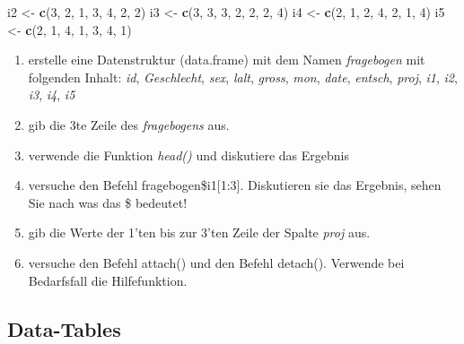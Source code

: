 \documentclass[]{article}
\newenvironment{Shaded}{\begin{snugshade}}{\end{snugshade}}
\newcommand{\KeywordTok}[1]{\textcolor[rgb]{0.13,0.29,0.53}{\textbf{#1}}}
\newcommand{\DecValTok}[1]{\textcolor[rgb]{0.00,0.00,0.81}{#1}}
\newcommand{\StringTok}[1]{\textcolor[rgb]{0.31,0.60,0.02}{#1}}
\newcommand{\NormalTok}[1]{#1}
\providecommand{\tightlist}{%
  \setlength{\itemsep}{0pt}\setlength{\parskip}{0pt}}
\begin{document}
\begin{Shaded}
\begin{Highlighting}[]
\NormalTok{    i2     <-}\StringTok{ }\KeywordTok{c}\NormalTok{(}\DecValTok{3}\NormalTok{, }\DecValTok{2}\NormalTok{, }\DecValTok{1}\NormalTok{, }\DecValTok{3}\NormalTok{, }\DecValTok{4}\NormalTok{, }\DecValTok{2}\NormalTok{, }\DecValTok{2}\NormalTok{)}
\NormalTok{    i3     <-}\StringTok{ }\KeywordTok{c}\NormalTok{(}\DecValTok{3}\NormalTok{, }\DecValTok{3}\NormalTok{, }\DecValTok{3}\NormalTok{, }\DecValTok{2}\NormalTok{, }\DecValTok{2}\NormalTok{, }\DecValTok{2}\NormalTok{, }\DecValTok{4}\NormalTok{)}
\NormalTok{    i4     <-}\StringTok{ }\KeywordTok{c}\NormalTok{(}\DecValTok{2}\NormalTok{, }\DecValTok{1}\NormalTok{, }\DecValTok{2}\NormalTok{, }\DecValTok{4}\NormalTok{, }\DecValTok{2}\NormalTok{, }\DecValTok{1}\NormalTok{, }\DecValTok{4}\NormalTok{)}
\NormalTok{    i5     <-}\StringTok{ }\KeywordTok{c}\NormalTok{(}\DecValTok{2}\NormalTok{, }\DecValTok{1}\NormalTok{, }\DecValTok{4}\NormalTok{, }\DecValTok{1}\NormalTok{, }\DecValTok{3}\NormalTok{, }\DecValTok{4}\NormalTok{, }\DecValTok{1}\NormalTok{)}
\end{Highlighting}
\end{Shaded}

\begin{enumerate}
\def\labelenumi{\arabic{enumi}.}
\tightlist
\item
  erstelle eine Datenstruktur (data.frame) mit dem Namen
  \emph{fragebogen} mit folgenden Inhalt: \emph{id}, \emph{Geschlecht},
  \emph{sex}, \emph{lalt}, \emph{gross}, \emph{mon}, \emph{date},
  \emph{entsch}, \emph{proj}, \emph{i1}, \emph{i2}, \emph{i3},
  \emph{i4}, \emph{i5}
\item
  gib die 3te Zeile des \emph{fragebogens} aus.
\item
  verwende die Funktion \emph{head()} und diskutiere das Ergebnis
\item
  versuche den Befehl fragebogen\$i1{[}1:3{]}. Diskutieren sie das
  Ergebnis, sehen Sie nach was das \$ bedeutet!
\item
  gib die Werte der 1'ten bis zur 3'ten Zeile der Spalte \emph{proj}
  aus.
\item
  versuche den Befehl attach() und den Befehl detach(). Verwende bei
  Bedarfsfall die Hilfefunktion.
\end{enumerate}

\subsection*{Data-Tables}\label{data-tables}
\end{document}
